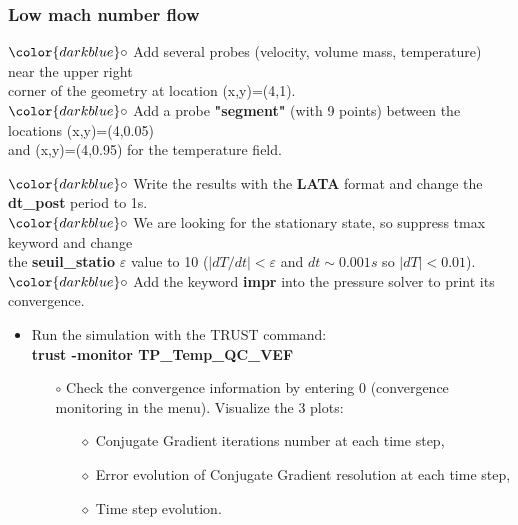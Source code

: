 \documentclass[10pt]{beamer}
\begin{document}
\begin{frame}
\frametitle{Low mach number flow}
\begin{block}{}

\hspace{1cm} $\color{darkblue}\circ$ {\small{Add several probes (velocity, volume mass, temperature) near the upper right\\
\hspace{1.3cm} corner of the geometry at location (x,y)=(4,1).}} \\

\hspace{1cm} $\color{darkblue}\circ$ {\small{Add a probe \textbf{"segment"} (with 9 points) between the locations (x,y)=(4,0.05) \\
\hspace{1.3cm} and (x,y)=(4,0.95) for the temperature field.}}

\hspace{1cm} $\color{darkblue}\circ$ {\small{Write the results with the \textbf{LATA} format and change the \textbf{dt\_post} period to 1s. }}\\

\hspace{1cm} $\color{darkblue}\circ$ {\small{We are looking for the stationary state, so suppress tmax keyword and change \\
\hspace{1.3cm} the \textbf{seuil\_statio} $\varepsilon$ value to 10 ($|dT/dt|<\varepsilon$ and $dt \sim 0.001s$ so $|dT|<0.01$).}}\\

\hspace{1cm} $\color{darkblue}\circ$ {\small{Add the keyword \textbf{impr} into the pressure solver to print its convergence.}}

\begin{itemize}
\item Run the simulation with the TRUST command:\\
\textbf{trust -monitor TP\_Temp\_QC\_VEF}\\
    \begin{itemize}
    \item [$\circ$]Check the convergence information by entering 0 (convergence monitoring in the menu). Visualize the 3 plots:
        \begin{itemize}
        \item [$\diamond$] Conjugate Gradient iterations number at each time step,
        \item [$\diamond$] Error evolution of Conjugate Gradient resolution at each time step,
        \item [$\diamond$] Time step evolution.
        \end{itemize}
    \end{itemize}
\end{itemize}

\end{block}
\end{frame}
\end{document}
